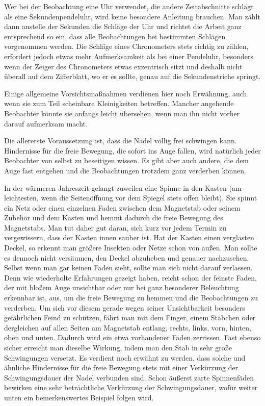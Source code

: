 Wer bei der Beobachtung eine Uhr verwendet, die andere Zeitabschnitte schlägt als eine Sekundenpendeluhr, wird keine besondere Anleitung brauchen. Man zählt dann anstelle der Sekunden die Schläge der Uhr und richtet die Arbeit ganz entsprechend so ein, dass alle Beobachtungen bei bestimmten Schlägen vorgenommen werden. Die Schläge eines Chronometers stets richtig zu zählen, erfordert jedoch etwas mehr Aufmerksamkeit als bei einer Pendeluhr, besonders wenn der Zeiger des Chronometers etwas exzentrisch sitzt und deshalb nicht überall auf dem Zifferblatt, wo er es sollte, genau auf die Sekundenstriche springt.

Einige allgemeine Vorsichtsmaßnahmen verdienen hier noch Erwähnung, auch wenn sie zum Teil scheinbare Kleinigkeiten betreffen. Mancher angehende Beobachter könnte sie anfangs leicht übersehen, wenn man ihn nicht vorher darauf aufmerksam macht.

Die allererste Voraussetzung ist, dass die Nadel völlig frei schwingen kann. Hindernisse für die freie Bewegung, die sofort ins Auge fallen, wird natürlich jeder Beobachter von selbst zu beseitigen wissen. Es gibt aber auch andere, die dem Auge fast entgehen und die Beobachtungen trotzdem ganz verderben können.

In der wärmeren Jahreszeit gelangt zuweilen eine Spinne in den Kasten (am leichtesten, wenn die Seitenöffnung vor dem Spiegel stets offen bleibt). Sie spinnt ein Netz oder einen einzelnen Faden zwischen dem Magnetstab oder seinem Zubehör und dem Kasten und hemmt dadurch die freie Bewegung des
Magnetstabs. Man tut daher gut daran, sich kurz vor jedem Termin zu vergewissern, dass der Kasten innen sauber ist. Hat der Kasten einen verglasten Deckel, so erkennt man größere Insekten oder Netze schon von außen. Man sollte es dennoch nicht versäumen, den Deckel abzuheben und genauer nachzusehen. Selbst wenn man gar keinen Faden sieht, sollte man sich nicht darauf verlassen. Denn wie wiederholte Erfahrungen gezeigt haben, reicht schon der feinste Faden, der mit bloßem Auge unsichtbar oder nur bei ganz besonderer Beleuchtung erkennbar ist, aus, um die freie Bewegung zu hemmen und die Beobachtungen zu verderben. Um sich vor diesem gerade wegen seiner Unsichtbarkeit besonders gefährlichen Feind zu schützen, fährt man mit dem Finger, einem Stäbchen oder dergleichen auf allen Seiten am Magnetstab entlang, rechts, links, vorn, hinten, oben und unten. Dadurch wird ein etwa vorhandener Faden zerrissen. Fast ebenso sicher erreicht man dieselbe Wirkung, indem man den Stab in sehr große Schwingungen versetzt. Es verdient noch erwähnt zu werden, dass solche und ähnliche Hindernisse für die freie Bewegung stets mit einer Verkürzung der Schwingungsdauer der Nadel verbunden sind. Schon äußerst zarte Spinnenfäden bewirken eine sehr beträchtliche Verkürzung der Schwingungsdauer, wofür weiter unten ein bemerkenswertes Beispiel folgen wird.

